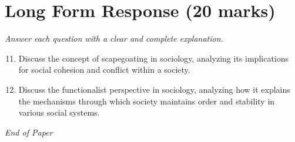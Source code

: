 \documentclass[12pt]{article}
\begin{document}
\section*{Long Form Response (20 marks)}
\textit{Answer each question with a clear and complete explanation.}
\begin{enumerate}[label=\arabic*.]
\setcounter{enumi}{10}
\item Discuss the concept of scapegoating in sociology, analyzing its implications for social cohesion and conflict within a society.
\item Discuss the functionalist perspective in sociology, analyzing how it explains the mechanisms through which society maintains order and stability in various social systems.
\end{enumerate}

\vfill
\noindent\textit{End of Paper}
\end{document}
